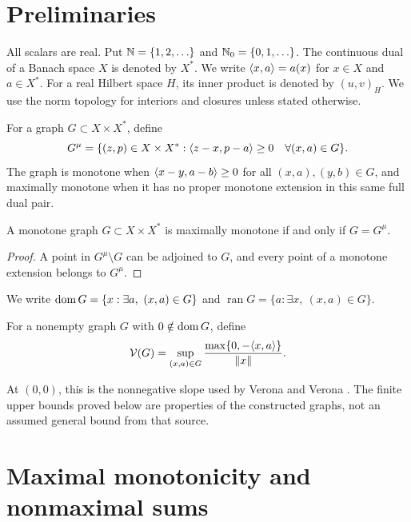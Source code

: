 \section{Preliminaries}
\label{sec:definitions}
All scalars are real. Put $\mathbb N=\{1,2,\ldots\}$ and $\mathbb N_0=\{0,1,\ldots\}$.
The continuous dual of a Banach space $X$ is denoted by $X^*$.
We write $\langle x,a\rangle=a(x)$ for $x\in X$ and $a\in X^*$.
For a real Hilbert space $H$, its inner product is denoted by
$(u,v)_H$. We use the norm topology for interiors and closures
unless stated otherwise.

\begin{definition}
For a graph $G\subset X\times X^*$, define
\begin{equation}
G^\mu=\{(z,p)\in X\times X^*:
 \langle z-x,p-a\rangle\ge0\quad\forall(x,a)\in G\}.
\label{eq:D1}
\end{equation}
The graph is monotone when $\langle x-y,a-b\rangle\ge0$ for all
$(x,a),(y,b)\in G$,
and maximally monotone when it has no proper monotone extension in this same
full dual pair.
\end{definition}

\begin{proposition}
A monotone graph $G\subset X\times X^*$ is maximally monotone
if and only if $G=G^\mu$.
\end{proposition}
\begin{proof}
A point in $G^\mu\setminus G$ can be adjoined to $G$, and every
point of a monotone extension belongs to $G^\mu$.
\end{proof}

We write
$\operatorname{dom} G=\{x:\exists a,\ (x,a)\in G\}$ and
$\operatorname{ran}G=\{a:\exists x,\ (x,a)\in G\}$.


\begin{definition}
For a nonempty graph $G$ with $0\notin\operatorname{dom} G$, define
\begin{equation}
\mathcal V(G)=\sup_{(x,a)\in G}
 \frac{\max\{0,-\langle x,a\rangle\}}{\|x\|}.
\label{eq:D3}
\end{equation}
\end{definition}
At $(0,0)$, this is the nonnegative slope used by Verona and Verona
\cite{verona2008}. The finite upper bounds proved below are properties
of the constructed graphs, not an assumed general bound from that source.

\section{Maximal monotonicity and nonmaximal sums}
\label{sec:endpoint-criterion}


